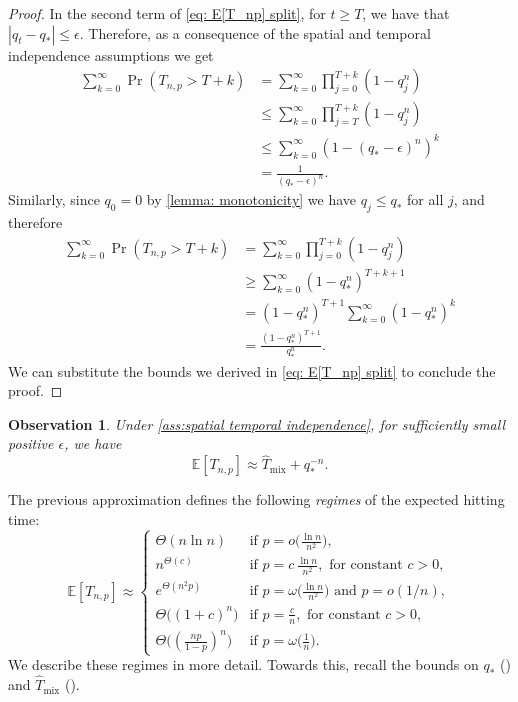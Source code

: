 \documentclass[11pt,a4paper]{article}
\newtheorem{observation}[theorem]{Observation}
\newcommand{\E}{\mathbb{E}}
\newcommand{\Tmar}{\hat{T}_{\mathrm{mix}}}
\begin{document}
\begin{proof}
In the second term of \cref{eq: E[T_np] split}, for $t \ge T$, we have that $|q_t - q_*| \le \epsilon$. 
Therefore, as a consequence of the spatial and temporal independence assumptions we get
\begin{align*}
    \sum_{k=0}^{\infty} \Pr(T_{n,p} > T+k)
    &= \sum_{k=0}^{\infty} \prod_{j=0}^{T+k} \left( 1 - q_j^n \right)
    \\
    &\le \sum_{k=0}^{\infty} \prod_{j=T}^{T+k}
    \left( 1 - q_j^n \right)
    \\
    &\le \sum_{k=0}^{\infty} (1- (q_* - \epsilon)^n)^k
    \\
    &= \frac{1}{(q_*-\epsilon)^n}.
\end{align*}
Similarly, since $q_0 = 0$ by \cref{lemma: monotonicity} we have $q_j \le q_*$ for all $j$, and therefore
\begin{align*}
    \sum_{k=0}^{\infty} \Pr(T_{n,p} > T+k)
    &= \sum_{k=0}^{\infty} \prod_{j=0}^{T+k} \left( 1 - q_j^n \right)
    \\
    &\ge \sum_{k=0}^{\infty} (1- q_*^n)^{T+k+1}
    \\
    &= (1- q_*^n)^{T+1} \sum_{k=0}^{\infty} (1- q_*^n)^{k}
    \\
    &= \frac{(1- q_*^n)^{T+1}}{q_*^n}.
\end{align*}
We can substitute the bounds we derived in \cref{eq: E[T_np] split} to conclude the proof. 
\end{proof}
\begin{observation}
Under \cref{ass:spatial temporal independence}, for sufficiently small positive $\epsilon$, we have
\[
    \E[T_{n,p}] \approx \Tmar + q_*^{-n}.
\]
\end{observation}
The previous approximation defines the following \textit{regimes} of the expected hitting time:
\[
\E[T_{n,p}] \approx \begin{cases}
    \Theta(n \ln n) & \text{if } p=o\big(\frac{\ln n}{n^2}\big), \\
    n^{\Theta(c)} & \text{if } p=c\,\frac{\ln n}{n^2}, \text{ for constant $c>0$}, \\
    e^{\Theta(n^2 p)} & \text{if } p=\omega\big(\frac{\ln n}{n^2}\big) \text{ and } p=o(1/n), \\
    \Theta\big((1+c)^n\big) & \text{if } p=\frac{c}{n}, \text{ for constant $c>0$}, \\
    \Theta\big((\frac{np}{1-p})^n\big) & \text{if } p=\omega\big(\frac{1}{n}\big).
\end{cases}
\]
We describe these regimes in more detail. Towards this, recall the bounds on $q_*$ () and $\Tmar$ (). 
\end{document}
